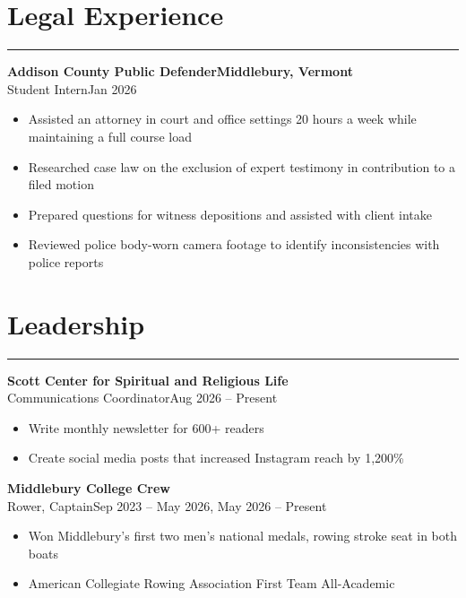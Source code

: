 \documentclass[12pt, a4paper]{article}
\begin{document}
\vspace{-9mm}
\section*{\centering Legal Experience}
\vspace{-7mm}
\rule{\linewidth}{0.4pt}
\textbf{Addison County Public Defender}\hfill\textbf{Middlebury, Vermont}\\
Student Intern\hfill{Jan 2026}\\
\begin{itemize}
    \vspace{-8mm}
    \item Assisted an attorney in court and office settings 20 hours a week while maintaining a full course load
    \item Researched case law on the exclusion of expert testimony in contribution to a filed motion
    \item Prepared questions for witness depositions and assisted with client intake
    \item Reviewed police body-worn camera footage to identify inconsistencies with police reports
\end{itemize}

\vspace{-7mm}
\section*{\centering Leadership}
\vspace{-7mm}
\rule{\linewidth}{0.4pt}
\textbf{Scott Center for Spiritual and Religious Life}\\
Communications Coordinator\hfill{Aug 2026 -- Present}\\
\begin{itemize}
    \vspace{-8mm}
    \item Write monthly newsletter for 600+ readers
    \item Create social media posts that increased Instagram reach by 1,200\%
\end{itemize}

\textbf{Middlebury College Crew}\\
Rower, Captain\hfill{Sep 2023 -- May 2026, May 2026 -- Present}\\
\begin{itemize}
    \vspace{-8mm}
    \item Won Middlebury’s first two men’s national medals, rowing stroke seat in both boats
    \item American Collegiate Rowing Association First Team All-Academic
\end{itemize}
\end{document}

